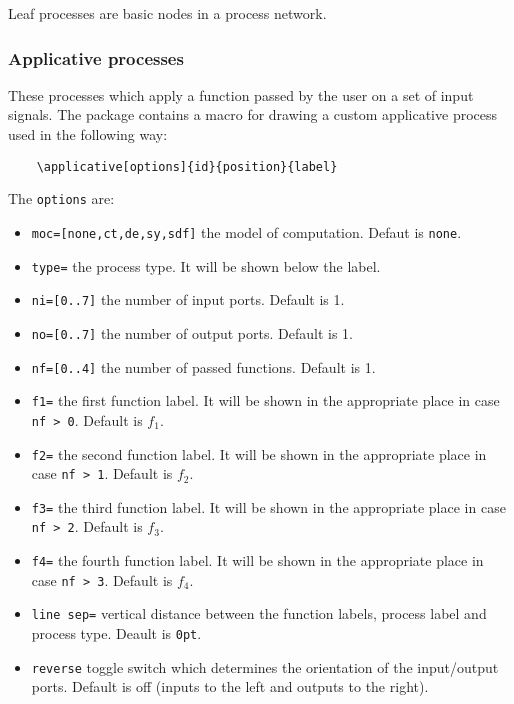 \documentclass[10pt]{article}
\begin{document}
Leaf processes are basic nodes in a process network.

\subsubsection{Applicative processes} \label{tikz_applicative}

These processes which apply a function passed by the user on a set of input signals. The package contains a macro for drawing a custom applicative process used in the following way:

\begin{verbatim}
	\applicative[options]{id}{position}{label}
\end{verbatim}

The \texttt{options} are:
\begin{itemize}
\item \texttt{moc=[none,ct,de,sy,sdf]} the model of computation. Defaut is \texttt{none}.
\item \texttt{type=} the process type. It will be shown below the label.
\item \texttt{ni=[0..7]} the number of input ports. Default is 1.
\item \texttt{no=[0..7]} the number of output ports. Default is 1.
\item \texttt{nf=[0..4]} the number of passed functions. Default is 1.
\item \texttt{f1=} the first function label. It will be shown in the appropriate place in case \texttt{nf > 0}. Default is $f_1$.
\item \texttt{f2=} the second function label. It will be shown in the appropriate place in case \texttt{nf > 1}. Default is $f_2$.
\item \texttt{f3=} the third function label. It will be shown in the appropriate place in case \texttt{nf > 2}. Default is $f_3$.
\item \texttt{f4=} the fourth function label. It will be shown in the appropriate place in case \texttt{nf > 3}. Default is $f_4$.
\item\texttt{line sep=} vertical distance between the function labels, process label and process type. Deault is \texttt{0pt}.
\item\texttt{reverse} toggle switch which determines the orientation of the input/output ports. Default is off (inputs to the left and outputs to the right).

\end{itemize}
\end{document}
